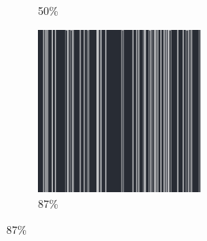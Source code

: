 \documentclass[12pt, fleqn]{report}                             %
\theoremstyle{break}                                            %
\begin{document}
\begin{figure}[ht!]
\begin{subfigure}[b]{0.4\linewidth}
          \caption{50\%}
        \end{subfigure}
        \begin{subfigure}[b]{0.4\linewidth}
          \includegraphics[width=0.6\textwidth]{Images/108/d.png}
          \caption{87\%}
        \end{subfigure}
      \end{figure}
\end{document}
